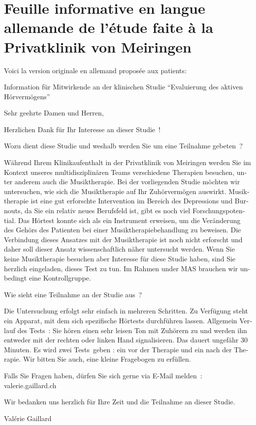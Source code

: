 \section{Feuille informative en langue allemande de l'étude faite à la Privatklinik von Meiringen}
Voici la version originale en allemand proposée aux patients:
\begin{german}

Information für Mitwirkende an der klinischen Studie
\foreignquote{german}{Evaluierung des aktiven Hörvermögens}


Sehr geehrte Damen und Herren,

Herzlichen Dank für Ihr Interesse an dieser Studie !

Wozu dient diese Studie und weshalb werden Sie um eine Teilnahme gebeten ?

Während Ihrem Klinikaufenthalt  in der Privatklinik von Meiringen werden Sie im Kontext
unseres multidisziplinären Teams verschiedene Therapien besuchen, unter anderem auch die Musiktherapie. Bei der vorliegenden Studie möchten wir untersuchen, wie sich die Musiktherapie auf Ihr Zuhörvermögen auswirkt.
Musiktherapie ist eine gut erforschte Intervention im Bereich des Depressions und Burnouts, da Sie ein relativ neues Berufsfeld ist, gibt es noch viel Forschungspotential.
Das Hörtest konnte sich als ein Instrument erweisen, um die Veränderung des Gehörs des Patienten bei einer Musiktherapiebehandlung zu beweisen. Die Verbindung dieses Ansatzes mit der Musiktherapie ist noch nicht erforscht und daher soll dieser Ansatz wissenschaftlich näher untersucht werden.
Wenn Sie keine Musiktherapie besuchen aber Interesse für diese Studie haben, sind Sie herzlich eingeladen, dieses Test zu tun. Im Rahmen under MAS brauchen wir unbedingt eine Kontrollgruppe.

Wie sieht eine Teilnahme an der Studie aus ?

Die Untersuchung erfolgt sehr einfach in mehreren Schritten.
Zu Verfügung steht ein Apparat, mit dem sich spezifische Hörtests durchführen lassen.
Allgemein Verlauf des Tests :
Sie hören einen sehr leisen Ton mit Zuhörern zu und werden ihn entweder mit der rechten  oder linken Hand  signalisieren. Das dauert ungefähr 30 Minuten.
Es wird zwei Tests geben : ein vor der Therapie und ein nach der Therapie.
Wir bitten Sie auch, eine kleine Fragebogen zu erfüllen.


Falls Sie Fragen haben, dürfen Sie sich gerne via E-Mail melden : valerie.gaillard\@gmx.ch

Wir bedanken uns herzlich für Ihre Zeit und die Teilnahme an dieser Studie.

\end{german}
Valérie Gaillard


